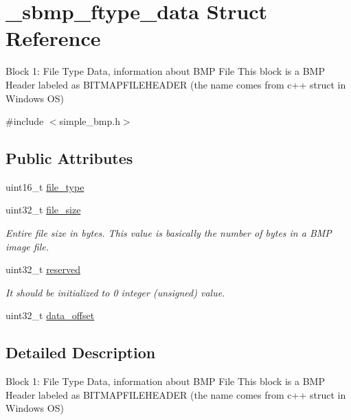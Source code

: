 \hypertarget{struct__sbmp__ftype__data}{}\section{\+\_\+sbmp\+\_\+ftype\+\_\+data Struct Reference}
\label{struct__sbmp__ftype__data}


Block 1\+: File Type Data, information about B\+MP File This block is a B\+MP Header labeled as B\+I\+T\+M\+A\+P\+F\+I\+L\+E\+H\+E\+A\+D\+ER (the name comes from c++ struct in Windows OS)  




{\ttfamily \#include $<$simple\+\_\+bmp.\+h$>$}

\subsection*{Public Attributes}
\begin{DoxyCompactItemize}
\item 
uint16\+\_\+t \hyperlink{struct__sbmp__ftype__data_a3ba110f10c409b5759de6b41e5bb22be}{file\+\_\+type}
\item 
uint32\+\_\+t \hyperlink{struct__sbmp__ftype__data_aad71d549f130552f1fedac4343113040}{file\+\_\+size}
\begin{DoxyCompactList}\small\item\em Entire file size in bytes. This value is basically the number of bytes in a B\+MP image file. \end{DoxyCompactList}\item 
uint32\+\_\+t \hyperlink{struct__sbmp__ftype__data_ac85168a19fe174929e0372e726ac6f0a}{reserved}
\begin{DoxyCompactList}\small\item\em It should be initialized to \textquotesingle{}0\textquotesingle{} integer (unsigned) value. \end{DoxyCompactList}\item 
uint32\+\_\+t \hyperlink{struct__sbmp__ftype__data_ae9ac805e628ee68aa81431272b5227ed}{data\+\_\+offset}
\end{DoxyCompactItemize}


\subsection{Detailed Description}
Block 1\+: File Type Data, information about B\+MP File This block is a B\+MP Header labeled as B\+I\+T\+M\+A\+P\+F\+I\+L\+E\+H\+E\+A\+D\+ER (the name comes from c++ struct in Windows OS) 

